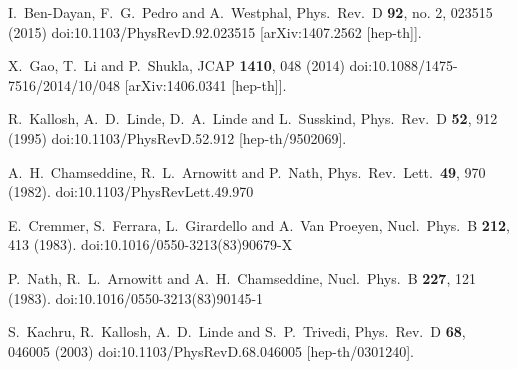 \documentclass[12pt]{article}
\begin{document}
\begin{thebibliography}{99}
  I.~Ben-Dayan, F.~G.~Pedro and A.~Westphal,
  Phys.\ Rev.\ D {\bf 92}, no. 2, 023515 (2015)
  doi:10.1103/PhysRevD.92.023515
  [arXiv:1407.2562 [hep-th]].


  X.~Gao, T.~Li and P.~Shukla,
  JCAP {\bf 1410}, 048 (2014)
  doi:10.1088/1475-7516/2014/10/048
  [arXiv:1406.0341 [hep-th]].


  R.~Kallosh, A.~D.~Linde, D.~A.~Linde and L.~Susskind,
  Phys.\ Rev.\ D {\bf 52}, 912 (1995)
  doi:10.1103/PhysRevD.52.912
  [hep-th/9502069].


  A.~H.~Chamseddine, R.~L.~Arnowitt and P.~Nath,
  Phys.\ Rev.\ Lett.\ {\bf 49}, 970 (1982).
  doi:10.1103/PhysRevLett.49.970


  E.~Cremmer, S.~Ferrara, L.~Girardello and A.~Van Proeyen,
  Nucl.\ Phys.\ B {\bf 212}, 413 (1983).
  doi:10.1016/0550-3213(83)90679-X


  P.~Nath, R.~L.~Arnowitt and A.~H.~Chamseddine,
  Nucl.\ Phys.\ B {\bf 227}, 121 (1983).
  doi:10.1016/0550-3213(83)90145-1


  S.~Kachru, R.~Kallosh, A.~D.~Linde and S.~P.~Trivedi,
  Phys.\ Rev.\ D {\bf 68}, 046005 (2003)
  doi:10.1103/PhysRevD.68.046005
  [hep-th/0301240].



\end{thebibliography}
\end{document}
